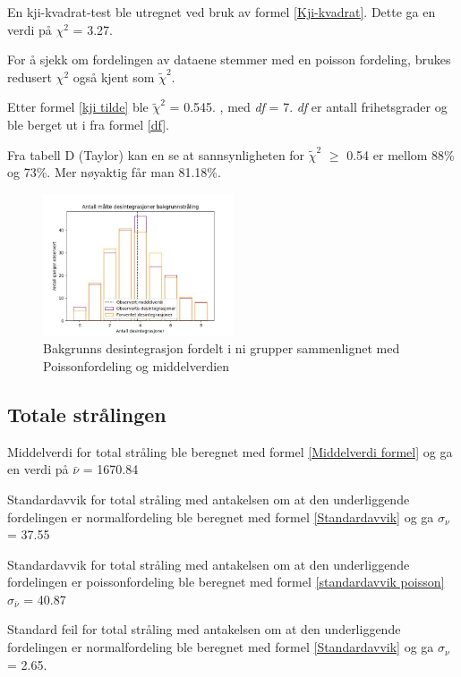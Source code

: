 \documentclass[twocolumn, 11pt]{article} %
\begin{document}
En kji-kvadrat-test ble utregnet ved bruk av formel \eqref{Kji-kvadrat}. Dette ga en verdi på \textit{$\chi^2$} = 3.27.

For å sjekk om fordelingen av dataene stemmer med en poisson fordeling, brukes redusert \textit{$\chi^2$} også kjent som \textit{$\tilde\chi^2$}.

Etter formel \eqref{kji tilde} ble \textit{$\tilde\chi^2$} = 0.545. , med \textit{df} = 7. \textit{df} er antall frihetsgrader og ble berget ut i fra formel \eqref{df}.

Fra tabell D (Taylor)\cite{taylor1997error} kan en se at sannsynligheten for \textit{$\tilde\chi^2$} $\geq$  0.54 er mellom 88\% og 73\%.  Mer nøyaktig får man 81.18\%.

\begin{figure}[ht]
\includegraphics[width=0.5\textwidth]{images/Background_radiation.jpg}
\caption{Bakgrunns desintegrasjon fordelt i ni grupper sammenlignet med Poissonfordeling og middelverdien}
\label{Background_radiation}
\end{figure}


\subsection{Totale strålingen} \label{Totale strålingen}
Middelverdi for total stråling ble beregnet med formel \eqref{Middelverdi formel} og ga en verdi på
\textit{$\bar\nu$} = 1670.84

Standardavvik for total stråling  med  antakelsen om at den underliggende fordelingen er normalfordeling ble beregnet med formel \eqref{Standardavvik} og ga
\textit{$\sigma_\nu$} = 37.55

Standardavvik for total stråling  med  antakelsen om at den underliggende fordelingen er poissonfordeling ble beregnet med formel \eqref{standardavvik poisson}
\textit{$\sigma_{\bar\nu}$} = 40.87

Standard feil for total stråling  med  antakelsen om at den underliggende fordelingen er normalfordeling ble beregnet med formel \eqref{Standardavvik} og ga
\textit{$\sigma_\nu$} = 2.65.
\end{document}
